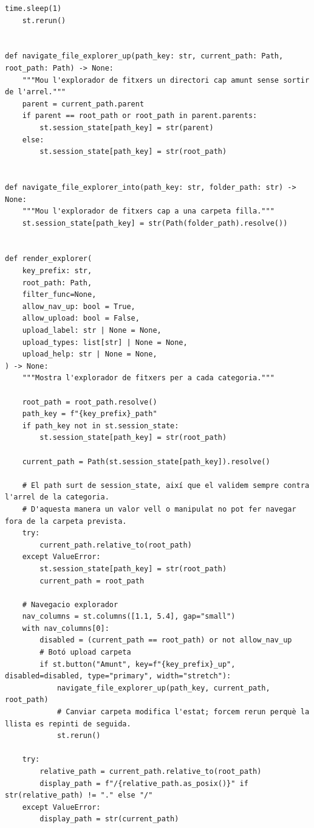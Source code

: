 \documentclass[10pt,a4paper]{article}
\begin{document}
\begin{lstlisting}[style=studioPython,caption={pages/Gestionar\_Arxius.py},label={lst:pages-gestionar-arxius-py}]
    time.sleep(1)
    st.rerun()


def navigate_file_explorer_up(path_key: str, current_path: Path, root_path: Path) -> None:
    """Mou l'explorador de fitxers un directori cap amunt sense sortir de l'arrel."""
    parent = current_path.parent
    if parent == root_path or root_path in parent.parents:
        st.session_state[path_key] = str(parent)
    else:
        st.session_state[path_key] = str(root_path)


def navigate_file_explorer_into(path_key: str, folder_path: str) -> None:
    """Mou l'explorador de fitxers cap a una carpeta filla."""
    st.session_state[path_key] = str(Path(folder_path).resolve())


def render_explorer(
    key_prefix: str,
    root_path: Path,
    filter_func=None,
    allow_nav_up: bool = True,
    allow_upload: bool = False,
    upload_label: str | None = None,
    upload_types: list[str] | None = None,
    upload_help: str | None = None,
) -> None:
    """Mostra l'explorador de fitxers per a cada categoria."""

    root_path = root_path.resolve()
    path_key = f"{key_prefix}_path"
    if path_key not in st.session_state:
        st.session_state[path_key] = str(root_path)

    current_path = Path(st.session_state[path_key]).resolve()

    # El path surt de session_state, així que el validem sempre contra l'arrel de la categoria.
    # D'aquesta manera un valor vell o manipulat no pot fer navegar fora de la carpeta prevista.
    try:
        current_path.relative_to(root_path)
    except ValueError:
        st.session_state[path_key] = str(root_path)
        current_path = root_path

    # Navegacio explorador
    nav_columns = st.columns([1.1, 5.4], gap="small")
    with nav_columns[0]:
        disabled = (current_path == root_path) or not allow_nav_up
        # Botó upload carpeta
        if st.button("Amunt", key=f"{key_prefix}_up", disabled=disabled, type="primary", width="stretch"):
            navigate_file_explorer_up(path_key, current_path, root_path)
            # Canviar carpeta modifica l'estat; forcem rerun perquè la llista es repinti de seguida.
            st.rerun()

    try:
        relative_path = current_path.relative_to(root_path)
        display_path = f"/{relative_path.as_posix()}" if str(relative_path) != "." else "/"
    except ValueError:
        display_path = str(current_path)


\end{lstlisting}
\end{document}

